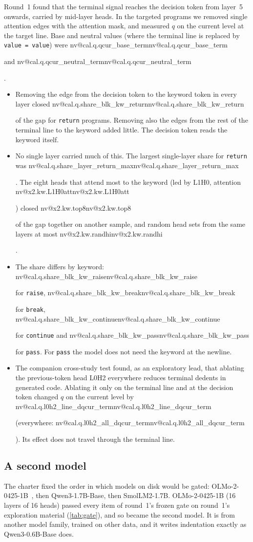 \documentclass[11pt]{article}
\makeatletter
\newcommand{\nv}[1]{\ifcsname nv@#1\endcsname\csname nv@#1\endcsname\else\PackageError{numbers}{Unknown number key #1}{}\fi}
\newcommand{\qw}{Qwen3-0.6B-Base}
\newcommand{\hd}[2]{L#1H#2}
\newcommand{\code}[1]{\texttt{#1}}
\makeatother
\begin{document}
Round~1 found that the terminal signal reaches the decision token from layer~5 onwards, carried by mid-layer heads. In the targeted programs we removed single attention edges with the attention mask, and measured $q$ on the current level at the target line. Base and neutral values (where the terminal line is replaced by \code{value = value}) were \nv{cal.q.qcur_base_term} and \nv{cal.q.qcur_neutral_term}.
\begin{itemize}
\item Removing the edge from the decision token to the keyword token in every layer closed \nv{cal.q.share_blk_kw_return} of the gap for \code{return} programs. Removing also the edges from the rest of the terminal line to the keyword added little. The decision token reads the keyword itself.
\item No single layer carried much of this. The largest single-layer share for \code{return} was \nv{cal.q.share_layer_return_max}. The eight heads that attend most to the keyword (led by \hd{1}{0}, attention \nv{x2.kw.L1H0att}) closed \nv{x2.kw.top8} of the gap together on another sample, and random head sets from the same layers at most \nv{x2.kw.randhi}.
\item The share differs by keyword: \nv{cal.q.share_blk_kw_raise} for \code{raise}, \nv{cal.q.share_blk_kw_break} for \code{break}, \nv{cal.q.share_blk_kw_continue} for \code{continue} and \nv{cal.q.share_blk_kw_pass} for \code{pass}. For \code{pass} the model does not need the keyword at the newline.
\item The companion cross-study test found, as an exploratory lead, that ablating the previous-token head \hd{0}{2} everywhere reduces terminal dedents in generated code. Ablating it only on the terminal line and at the decision token changed $q$ on the current level by \nv{cal.q.l0h2_line_dqcur_term} (everywhere: \nv{cal.q.l0h2_all_dqcur_term}). Its effect does not travel through the terminal line.
\end{itemize}

\subsection{A second model}
\label{sec:olmo}

The charter fixed the order in which models on disk would be gated: OLMo-2-0425-1B~\citep{olmo2025olmo2}, then Qwen3-1.7B-Base, then SmolLM2-1.7B. OLMo-2-0425-1B (16 layers of 16 heads) passed every item of round~1's frozen gate on round~1's exploration material (\cref{tab:gate}), and so became the second model. It is from another model family, trained on other data, and it writes indentation exactly as \qw{} does.
\end{document}

